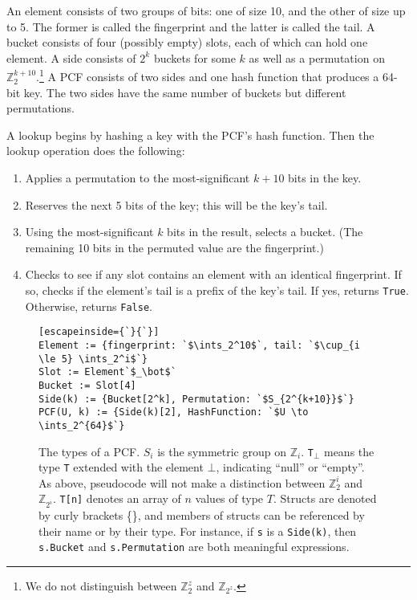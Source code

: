 \documentclass[letterpaper, 11pt]{article}
\newcommand{\ints}{\mathbb{Z}}
\begin{document}
An element consists of two groups of bits: one of size 10, and the other of size up to 5.
The former is called the fingerprint and the latter is called the tail.
A bucket consists of four (possibly empty) slots, each of which can hold one element.
A side consists of $2^k$ buckets for some $k$ as well as a permutation on $\ints_2^{k+10}$.\footnote{We do not distinguish between $\ints_2^z$ and $\ints_{2^z}$.}
A PCF consists of two sides and one hash function that produces a 64-bit key.
The two sides have the same number of buckets but different permutations.

A lookup begins by hashing a key with the PCF's hash function.
Then the lookup operation does the following:

\begin{enumerate}
\item Applies a permutation to the most-significant $k+10$ bits in the key.
\item Reserves the next 5 bits of the key; this will be the key's tail.
\item Using the most-significant $k$ bits in the result, selects a bucket.
(The remaining 10 bits in the permuted value are the fingerprint.)
\item Checks to see if any slot contains an element with an identical fingerprint.
If so, checks if the element's tail is a prefix of the key's tail.
If yes, returns \verb|True|.
Otherwise, returns \verb|False|.
\end{enumerate}

\begin{figure}
\begin{lstlisting}[escapeinside={`}{`}]
Element := {fingerprint: `$\ints_2^10$`, tail: `$\cup_{i \le 5} \ints_2^i$`}
Slot := Element`$_\bot$`
Bucket := Slot[4]
Side(k) := {Bucket[2^k], Permutation: `$S_{2^{k+10}}$`}
PCF(U, k) := {Side(k)[2], HashFunction: `$U \to \ints_2^{64}$`}
\end{lstlisting}
\caption{\protect
The types of a PCF.
  $S_i$ is the symmetric group on $\ints_i$.
  \texttt{T}$_\bot$ means the type \texttt{T} extended with the element $\bot$, indicating ``null'' or ``empty''.
  As above, pseudocode will not make a distinction between $\ints_2^i$ and $\ints_{2^i}$.
  \texttt{T[n]} denotes an array of $n$ values of type $T$.
  Structs are denoted by curly brackets \{\}, and members of structs can be referenced by their name or by their type.
  For instance, if \texttt{s} is a \texttt{Side(k)}, then \texttt{s.Bucket} and \texttt{s.Permutation} are both meaningful expressions.
}
\end{figure}
\end{document}
